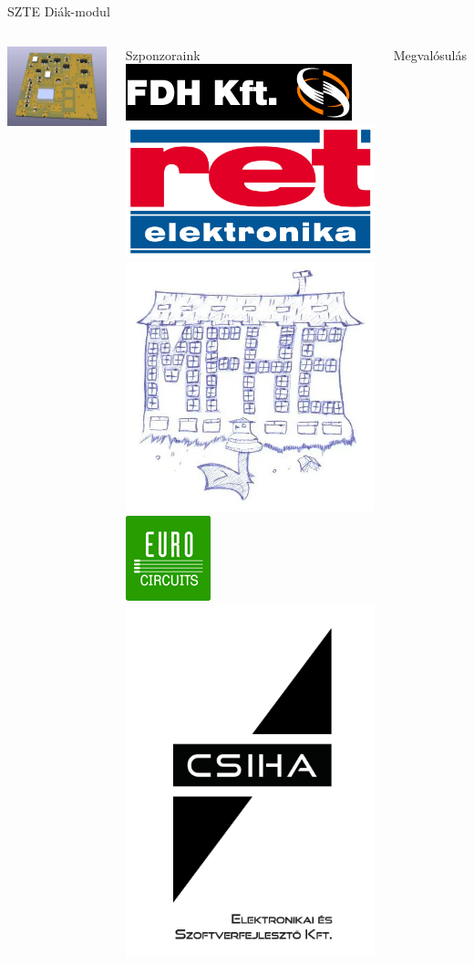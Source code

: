 \begin{frame}{SZTE Diák-modul}
\begin{columns}
	\begin{center}
		\includegraphics[width=.7\textwidth]{3d_render}
	\end{center}
	\begin{block}{Szponzoraink}
			\includegraphics[width=0.3\linewidth]{fdh}
			\includegraphics[width=0.17\linewidth]{ret}
			\includegraphics[width=0.17\linewidth]{mfhe}
			\includegraphics[width=0.13\linewidth]{eurocircuits}
			\includegraphics[width=0.15\linewidth]{csiha}
	\end{block}
	\begin{block}{Megvalósulás}

\end{block}
\end{columns}
\end{frame}
